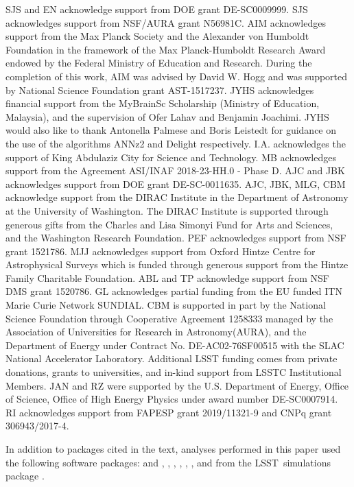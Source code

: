 \documentclass[\docopts]{\docclass}
\newcommand{\proj}[1]{\textsc{#1}}
\newcommand{\lsst}{\proj{LSST}}
\begin{document}
SJS and EN acknowledge support from DOE grant DE-SC0009999.  SJS acknowledges support from NSF/AURA grant N56981C.
AIM acknowledges support from the Max Planck Society and the Alexander von Humboldt Foundation in the framework of the Max Planck-Humboldt Research Award endowed by the Federal Ministry of Education and Research.
During the completion of this work, AIM was advised by David W. Hogg and was supported by National Science Foundation grant AST-1517237.
JYHS acknowledges financial support from the MyBrainSc Scholarship (Ministry of Education, Malaysia), and the supervision of Ofer Lahav and Benjamin Joachimi.
JYHS would also like to thank Antonella Palmese and Boris Leistedt for guidance on the use of the algorithms ANNz2 and Delight respectively.
I.A. acknowledges the support of King Abdulaziz City for Science and Technology.
MB acknowledges support from the Agreement ASI/INAF 2018-23-HH.0 - Phase D.
AJC and JBK acknowledges support from DOE grant DE-SC-0011635. AJC, JBK, MLG, CBM acknowledge support from the DIRAC Institute in the Department of Astronomy at the University of Washington. The DIRAC Institute is supported through generous gifts from the Charles and Lisa Simonyi Fund for Arts and Sciences, and the Washington Research Foundation.
PEF acknowledges support from NSF grant 1521786.
MJJ acknowledges support from Oxford Hintze Centre for Astrophysical Surveys which is funded through generous support from the Hintze Family Charitable Foundation.
ABL and TP acknowledge support from NSF DMS grant 1520786.
GL acknowledges partial funding from the EU funded ITN Marie Curie Network SUNDIAL.
CBM is supported in part by the National Science Foundation through Cooperative Agreement 1258333 managed by the Association of Universities for Research in Astronomy(AURA), and the Department of Energy under Contract No. DE-AC02-76SF00515 with the SLAC National Accelerator Laboratory. Additional LSST funding comes from private donations, grants to universities, and in-kind support from LSSTC Institutional Members.
JAN and RZ were supported by the U.S. Department of Energy, Office of Science, Office of High Energy Physics under award number DE-SC0007914.
RI acknowledges support from FAPESP grant 2019/11321-9 and CNPq grant 306943/2017-4.

In addition to packages cited in the text, analyses performed in this paper used the following software packages:  and  \citep{numpyscipy},  \citep{matplotlib},  \citep{seaborn},  \citep{minfunc},  \citep{Malz:qp, Malz:2018},  \citep{pyskynet}, and  from the \lsst\ simulations package \citep{lsstphotutils}.
\end{document}
